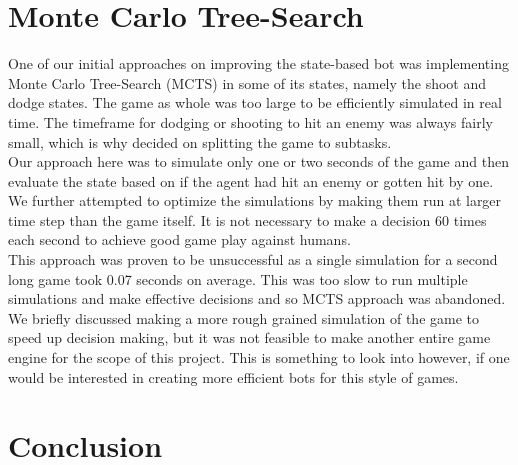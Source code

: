 \documentclass{article}
\begin{document}
	\section{Monte Carlo Tree-Search}
	One of our initial approaches on improving the state-based bot was implementing Monte Carlo Tree-Search (MCTS) in some of its states, namely the shoot and dodge states. The game as whole was too large to be efficiently simulated in real time. The timeframe for dodging or shooting to hit an enemy was always fairly small, which is why decided on splitting the game to subtasks. \\
	Our approach here was to simulate only one or two seconds of the game and then evaluate the state based on if the agent had hit an enemy or gotten hit by one. We further attempted to optimize the simulations by making them run at larger time step than the game itself. It is not necessary to make a decision 60 times each second to achieve good game play against humans. \\
	This approach was proven to be unsuccessful as a single simulation for a second long game took 0.07 seconds on average. This was too slow to run multiple simulations and make effective decisions and so MCTS approach was abandoned. \\
	We briefly discussed making a more rough grained simulation of the game to speed up decision making, but it was not feasible to make another entire game engine for the scope of this project. This is something to look into however, if one would be interested in creating more efficient bots for this style of games.
	
	
	\section{Conclusion}
	
	
	
\end{document}
